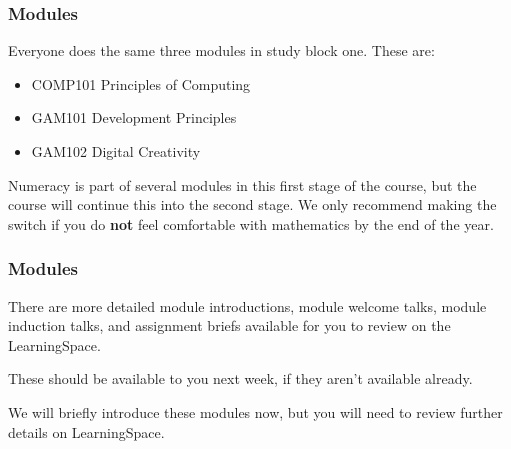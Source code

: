 \begin{frame}
	\frametitle{Modules}
	
	Everyone does the same three modules in study block one. These are:
	
	\vspace{0.5em}
	
	\begin{itemize}
		\item COMP101 Principles of Computing
		\item GAM101 Development Principles
		\item GAM102 Digital Creativity

	\end{itemize}
	
	\vspace{1em}
	
	Numeracy is part of several modules in this first stage of the course, but the  course will  continue this into the second stage. We only recommend making the switch if you do \textbf{not} feel comfortable with mathematics by the end of the year.
	
\end{frame}

\begin{frame}
	\frametitle{Modules}
	
	There are more detailed module introductions, module welcome talks, module induction talks, and assignment briefs available for you to review on the LearningSpace.
	
	\vspace{0.5em}
	
	These should be available to you next week, if they aren't available already.
	
	\vspace{0.5em}
	
	We will briefly introduce these modules now, but you will need to review further details on LearningSpace.
	
\end{frame}

